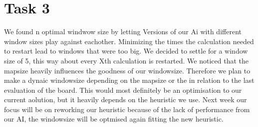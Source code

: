 
\section{Task 3}
We found n optimal windwow size by letting Versions of our Ai with different window sizes play against eachother. Minimizing the times the calculation needed to restart lead to windows that were too big. We decided to settle for a window size of 5, this way about every Xth calculation is restarted. We noticed that the mapsize heavily influences the goodness of our windowsize. Therefore we plan to make a dynaic windowsize depending on the mapsize or the in relation to the last evaluation of the board. This would most definitely be an optimisation to our current aolution, but it heavily depends on the heuristic we use. Next week our focus will be on reworking our heuristic because of the lack of performance from our AI, the windowsize will be optmised again fitting the new heuristic.